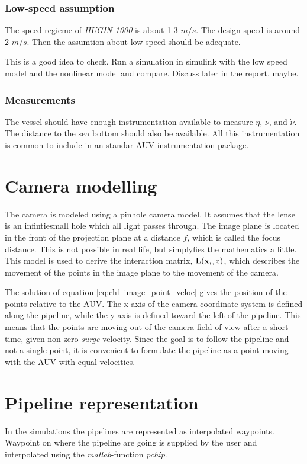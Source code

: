 		\subsubsection{Low-speed assumption}
		The speed regieme of \textit{HUGIN 1000} is about 1-3 $m/s$. The design speed is around 2 $m/s$. 
		Then the assumtion about low-speed should be adequate.  

		This is a good idea to check. Run a simulation in simulink with the low speed model and the 
		nonlinear model and compare. Discuss later in the report, maybe.
		
		\subsubsection{Measurements}
		The vessel should have enough instrumentation available to measure $\eta$, $\nu$, and $\dot{\nu}$. 
		The distance to the sea bottom should also be available. All this instrumentation is common to 
		include in an standar AUV instrumentation package. 


\section{Camera modelling}
	The camera is modeled using a pinhole camera model. It assumes that the lense is an infintiesmall hole which 
	all light passes through. The image plane is located in the front of the projection plane at a distance $f$, 
	which is called the focus distance. This is not possible in real life, but simplyfies the mathematics a little. 
	This model is used to derive the interaction matrix, $\mathbf{L}(\mathbf{x}_i, z)$, which describes the movement of the 
	points in the image plane to the movement of the camera.\cite{robotbok} 

	The solution of equation \eqref{eq:ch1-image_point_veloc} gives the position of the points relative
	to the AUV. The x-axis of the camera coordinate system is defined along the pipeline, while the y-axis 
	is defined toward the left of the pipeline. This means that the points are moving out of the camera
	field-of-view after a short time, given non-zero \textit{surge}-velocity. Since the goal is to follow
	the pipeline and not a single point, it is convenient to formulate the pipeline as a point moving with
	the AUV with equal velocities. 

	


\section{Pipeline representation}
	In the simulations the pipelines are represented as interpolated waypoints. Waypoint on where the pipeline are
	going is supplied by the user and interpolated using the \textit{matlab}-function \textit{pchip}. 



